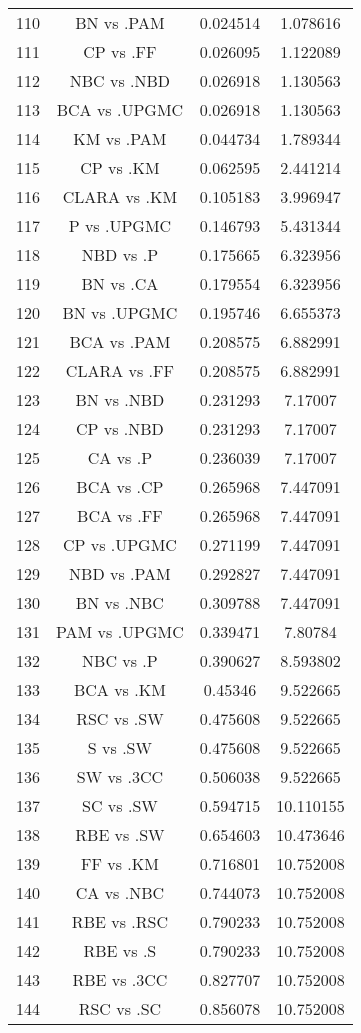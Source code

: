 \documentclass[a4paper,10pt]{article}
\begin{document}
\begin{landscape}
\begin{table}[!htp]
\begin{tabular}{cccc}
110&BN vs .PAM&0.024514&1.078616\\
111&CP vs .FF&0.026095&1.122089\\
112&NBC vs .NBD&0.026918&1.130563\\
113&BCA vs .UPGMC&0.026918&1.130563\\
114&KM vs .PAM&0.044734&1.789344\\
115&CP vs .KM&0.062595&2.441214\\
116&CLARA vs .KM&0.105183&3.996947\\
117&P vs .UPGMC&0.146793&5.431344\\
118&NBD vs .P&0.175665&6.323956\\
119&BN vs .CA&0.179554&6.323956\\
120&BN vs .UPGMC&0.195746&6.655373\\
121&BCA vs .PAM&0.208575&6.882991\\
122&CLARA vs .FF&0.208575&6.882991\\
123&BN vs .NBD&0.231293&7.17007\\
124&CP vs .NBD&0.231293&7.17007\\
125&CA vs .P&0.236039&7.17007\\
126&BCA vs .CP&0.265968&7.447091\\
127&BCA vs .FF&0.265968&7.447091\\
128&CP vs .UPGMC&0.271199&7.447091\\
129&NBD vs .PAM&0.292827&7.447091\\
130&BN vs .NBC&0.309788&7.447091\\
131&PAM vs .UPGMC&0.339471&7.80784\\
132&NBC vs .P&0.390627&8.593802\\
133&BCA vs .KM&0.45346&9.522665\\
134&RSC vs .SW&0.475608&9.522665\\
135&S vs .SW&0.475608&9.522665\\
136&SW vs .3CC&0.506038&9.522665\\
137&SC vs .SW&0.594715&10.110155\\
138&RBE vs .SW&0.654603&10.473646\\
139&FF vs .KM&0.716801&10.752008\\
140&CA vs .NBC&0.744073&10.752008\\
141&RBE vs .RSC&0.790233&10.752008\\
142&RBE vs .S&0.790233&10.752008\\
143&RBE vs .3CC&0.827707&10.752008\\
144&RSC vs .SC&0.856078&10.752008\\

\end{tabular}
\end{table}
\end{landscape}
\end{document}
